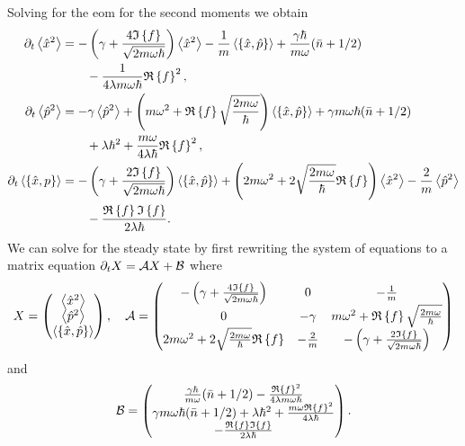 Solving for the \gls{eom} for the second moments we obtain
\begin{align}
    \dt \expval{\xop^2} &= -\left(\gamma + \frac{4\im{f}}{\sqrt{2 m \omega \hbar}}\right) \expval{\xop^2} - \frac{1}{m} \expval{\acomm{\xop}{\pop}} + \frac{\gamma \hbar}{m \omega} (\nbar + 1/2) \nonumber\label{eq:x2Feedback} \\
    &\qquad - \frac{1}{4\lambda m \omega \hbar} \re{f}^2,\\
    \dt \expval{\pop^2} &=  -\gamma \expval{\pop^2} + \left( m\omega^2 + \re{f} \sqrt{\frac{2m \omega}{\hbar}} \right)\expval{\acomm{\xop}{\pop}} + \gamma m \omega \hbar (\nbar + 1/2) \nonumber \\
    &\qquad+ \lambda \hbar^2 + \frac{m \omega}{4 \lambda \hbar}\re{f}^2,\label{eq:p2Feedback} \\
    \dt \expval{\acomm{\xop}{p}} &= -\left(\gamma + \frac{2\im{f}}{\sqrt{2m \omega \hbar}}  \right)\expval{\acomm{\xop}{\pop}} + \left(2 m \omega^2 + 2 \sqrt{\frac{2 m \omega}{\hbar}}\re{f} \right) \expval{\xop^2} - \frac{2}{m} \expval{\pop^2}\nonumber\\ 
    &\qquad - \frac{\re{f} \im{f}}{2 \lambda \hbar}.\label{eq:xpFeedback}
\end{align}
We can solve for the steady state by first rewriting the system of equations to a matrix equation $\partial_t X = \mathcal{A} X + \mathcal{B}$ where
\begin{equation}
    X =
    \begin{pmatrix}
        \expval{\xop^2}\\
        \expval{\pop^2}\\
        \expval{\acomm{\xop}{\pop}}    
    \end{pmatrix}, \quad
    \mathcal{A} = \begin{pmatrix}
        -\left(\gamma + \frac{4\im{f}}{\sqrt{2 m \omega \hbar}}\right) & 0 & -\frac{1}{m} \\
        0 & -\gamma & m\omega^2 + \re{f} \sqrt{\frac{2m \omega}{\hbar}} \\
        2 m \omega^2 + 2 \sqrt{\frac{2 m \omega}{\hbar}}\re{f} & -\frac{2}{m} & -\left(\gamma +\frac{2\im{f}}{\sqrt{2m \omega \hbar}}\right) \label{eq:matrixA}
    \end{pmatrix}
\end{equation}
and
\begin{equation}
    \mathcal{B} = 
    \begin{pmatrix}
        \frac{\gamma \hbar}{m \omega} (\bar{n} + 1/2) - \frac{\mathfrak{R}\left\{f\right\}^2}{4\lambda m \omega \hbar}\\
        \gamma m \omega \hbar (\bar{n} + 1/2) + \lambda \hbar^2 +\frac{m \omega \mathfrak{R}\left\{f\right\}^2}{4 \lambda \hbar}\\
        -\frac{\mathfrak{R}\left\{f\right\} \mathfrak{I}\left\{f\right\}}{2 \lambda \hbar}
    \end{pmatrix}.
\end{equation}
